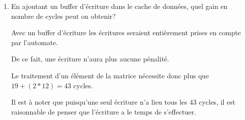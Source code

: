 \begin{enumerate}
\begin{correction}
      Le taux de \textit{Miss} est donc de 100\%.

      Rappelons que le cache d'instruction est parfait et ne g\'en\`ere donc
      aucun \textit{Miss}.

      La p\'enalit\'e en lecture par rapport \`a la m\'emoire parfaite est
      donc de $13 - 1 = 12$ cycles.

      Puisque le cache de donn\'ees est de type \textit{Write Through}, un
      acc\`es m\'emoire intervient \`a chaque \'ecriture.

      La p\'enalit\'e en \'ecriture par rapport \`a la m\'emoire parfaite est
      donc de $8 - 1 = 7$ cycles.

      Dans le code d'origine il y a deux instructions de lecture et une
      instruction d'\'ecriture.

      Le traitement d'un \'el\'ement de la matrice n\'ecessite donc
      $19 + (2 * 12) + (1 * 7) = 50$ cycles.

    \end{correction}
  \item
    En ajoutant un buffer d'\'ecriture dans le cache de donn\'ees, quel
    gain en nombre de cycles peut on obtenir?

    \begin{correction}

      Avec un buffer d'\'ecriture les \'ecritures seraient enti\`erement prises
      en compte par l'automate.

      De ce fait, une \'ecriture n'aura plus aucune p\'enalit\'e.

      Le traitement d'un \'el\'ement de la matrice n\'ecessite donc plus
      que $19 + (2 * 12) = 43$ cycles.

      Il est \`a noter que puisqu'une seul \'ecriture n'a lieu tous les $43$
      cycles, il est raisonnable de penser que l'\'ecriture a le temps de
      s'effectuer.

    \end{correction}
\end{enumerate}


